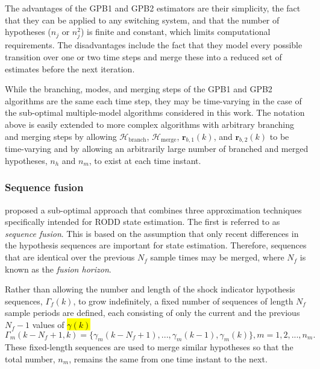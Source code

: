 {{The advantages of the \gls{GPB1} and \gls{GPB2} estimators are their simplicity, the fact that they can be applied to any switching system, and that the number of hypotheses ($n_j$ or $n_j^2$) is finite and constant, which limits computational requirements. The disadvantages include the fact that they model every possible transition over one or two time steps and merge these into a reduced set of estimates before the next iteration. 

While the branching, modes, and merging steps of the \gls{GPB1} and \gls{GPB2} algorithms are the same each time step, they may be time-varying in the case of the sub-optimal multiple-model algorithms considered in this work. The notation above is easily extended to more complex algorithms with arbitrary branching and merging steps by allowing $\mathcal{H}_{\text{branch}}$, $\mathcal{H}_{\text{merge}}$, $\mathbf{r}_{b,1}(k)$, and $\mathbf{r}_{b,2}(k)$ to be time-varying and by allowing an arbitrarily large number of branched and merged hypotheses, $n_h$ and $n_m$, to exist at each time instant.

\subsubsection{Sequence fusion} \label{sec:fusion}

\cite{robertson_detection_1995} proposed a sub-optimal approach that combines three approximation techniques specifically intended for \gls{RODD} state estimation. The first is referred to as \textit{sequence fusion}. This is based on the assumption that only recent differences in the hypothesis sequences are important for state estimation. Therefore, sequences that are identical over the previous $N_f$ sample times may be merged, where $N_f$ is known as the \textit{fusion horizon}.
%

Rather than allowing the number and length of the shock indicator hypothesis sequences, $\Gamma_f(k)$, to grow indefinitely, a fixed number of sequences of length $N_f$ sample periods are defined, each consisting of only the current and the previous $N_f-1$ values of \hl{$\gamma(k)$}
%
\begin{equation} \label{eq:Gamma_kmf_k}
	\Gamma_m(k-N_f+1,k) = \{\gamma_m(k-N_f+1), ...,  \gamma_m(k-1), \gamma_m(k)\}, m=1,2,..., n_m.
\end{equation}
These fixed-length sequences are used to merge similar hypotheses so that the total number, $n_m$, remains the same from one time instant to the next.

}}
